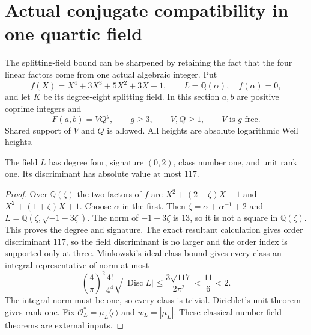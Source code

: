 \section{Actual conjugate compatibility in one quartic field}
\label{sec:single-quartic-compatible}

The splitting-field bound can be sharpened by retaining the fact that
the four linear factors come from one actual algebraic integer. Put
\[
 f(X)=X^4+3X^3+5X^2+3X+1,\qquad L=\mathbb Q(\alpha),\quad f(\alpha)=0,
\]
and let $K$ be its degree-eight splitting field. In this section $a,b$
are positive coprime integers and
\[
 F(a,b)=VQ^g,\qquad g\ge3,\qquad V,Q\ge1,\qquad V\text{ is }g\text{-free}.
\]
Shared support of $V$ and $Q$ is allowed. All heights are absolute
logarithmic Weil heights.

\begin{theorem}
The field $L$ has degree four, signature $(0,2)$, class number one, and
unit rank one. Its discriminant has absolute value at most $117$.
\end{theorem}
\begin{proof}
Over $\mathbb Q(\zeta)$ the two factors of $f$ are
$X^2+(2-\zeta)X+1$ and $X^2+(1+\zeta)X+1$. Choose $\alpha$ in the
first. Then $\zeta=\alpha+\alpha^{-1}+2$ and
$L=\mathbb Q(\zeta,\sqrt{-1-3\zeta})$. The norm of $-1-3\zeta$ is
$13$, so it is not a square in $\mathbb Q(\zeta)$. This proves the
degree and signature. The exact resultant calculation gives order
discriminant $117$, so the field discriminant is no larger and the
order index is supported only at three. Minkowski's ideal-class bound
\cite[Theorem~4.3]{MilneANT2020} gives every class an integral representative
of norm at most
\[
 \left(\frac4\pi\right)^2\frac{4!}{4^4}\sqrt{|\operatorname{Disc}L|}
 \le\frac{3\sqrt{117}}{2\pi^2}<\frac{11}{6}<2.
\]
The integral norm must be one, so every class is trivial. Dirichlet's
unit theorem gives rank one. Fix
$\mathcal O_L^*=\mu_L\langle\epsilon\rangle$ and $w_L=|\mu_L|$.
These classical number-field theorems are external inputs.
\end{proof}

